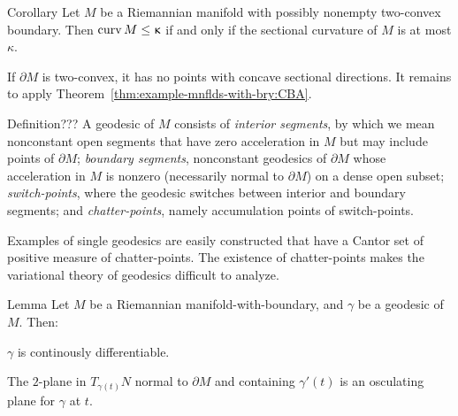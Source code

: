 \begin{thm}{Corollary}
Let $M$ be a Riemannian manifold with possibly nonempty two-convex boundary.
Then $\curv M\le{\kappa}$ 
if and only if the sectional curvature of $M$ is at most $\kappa$.
\end{thm}

If $\partial M$ is two-convex, 
it has no points with concave sectional directions.
It remains to apply Theorem~\ref{thm:example-mnflds-with-bry:CBA}.
\qeds

\begin{thm}{Definition}\label{def:mwb-segment}??? A geodesic of $M$ consists of  \emph{interior
segments}, by which we mean nonconstant open segments  that have zero acceleration in $M$ but
may include points of $\partial M$;  \emph{boundary segments}, nonconstant geodesics of $\partial M$ whose acceleration in $M$ is nonzero (necessarily normal to $\partial M$) on a dense open subset; \emph{switch-points}, where the geodesic switches between interior and boundary segments;  and \emph{chatter-points}, namely accumulation points of switch-points. 
\end{thm}

Examples of single geodesics are easily constructed that have a Cantor set of positive measure of chatter-points.
The existence of chatter-points makes the variational theory of geodesics
difficult to analyze.


\begin{thm}{Lemma}\label{lem:m-w-b-geodesic-'}
Let $M$ be a Riemannian manifold-with-boundary, and $\gamma$ be a geodesic of $M$. Then:
\begin{subthm}{}
$\gamma$ is continously differentiable.
\end{subthm}
\begin{subthm}{}
The $2$-plane in $T_{\gamma(t)}N$  normal to $\partial M$ and containing $\gamma'(t)$ is an osculating plane for $\gamma$ at $t$.
\end{subthm}
\end{thm}



